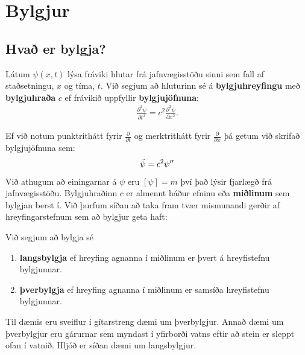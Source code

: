 
\chapter{Bylgjur}

\section{Hvað er bylgja?}

\begin{tcolorbox}
\begin{definition}
Látum $\psi(x,t)$ lýsa fráviki hlutar frá jafnvægisstöðu sinni sem fall af staðsetningu, $x$ og tíma, $t$. Við segjum að hluturinn sé á \textbf{bylgjuhreyfingu} með \textbf{bylgjuhraða} $c$ ef frávikið uppfyllir \textbf{bylgjujöfnuna}:
\begin{align*}
    \frac{\partial^2\psi}{\partial t^2} = c^2 \frac{\partial^2 \psi}{\partial x^2}.
\end{align*}
\end{definition}
\end{tcolorbox}

Ef við notum punktrithátt fyrir $\frac{\partial}{\partial t}$ og merktrithátt fyrir $\frac{\partial}{\partial x}$ þá getum við skrifað bylgjujöfnuna sem:
\begin{align*}
    \Ddot{\psi} = c^2 \psi''
\end{align*}
Við athugum að einingarnar á $\psi$ eru $\left[ \psi \right] = \si{m}$ því það lýsir fjarlægð frá jafnvægisstöðu. Bylgjuhraðinn $c$ er almennt háður efninu eða \textbf{miðlinum} sem bylgjan berst í. Við þurfum síðan að taka fram tvær mismunandi gerðir af hreyfingarstefnum sem að bylgjur geta haft:

\begin{tcolorbox}
\begin{definition}
Við segjum að bylgja sé
\begin{enumerate}[label = \textbf{(\roman*)}]
    \item \textbf{langsbylgja} ef hreyfing agnanna í miðlinum er þvert á hreyfistefnu bylgjunnar.
    \item \textbf{þverbylgja} ef hreyfing agnanna í miðlinum er samsíða hreyfistefnu bylgjunnar.
\end{enumerate}
\end{definition}
\end{tcolorbox}

Til dæmis eru sveiflur í gítarstreng dæmi um þverbylgjur. Annað dæmi um þverbylgjur eru gárurnar sem myndast í yfirborði vatns eftir að stein er sleppt ofan í vatnið. Hljóð er síðan dæmi um langsbylgjur.

